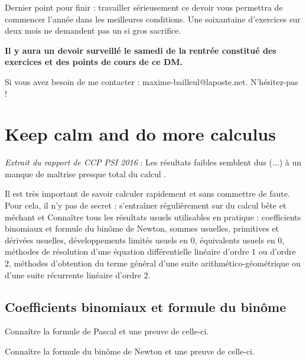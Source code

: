 \documentclass[a4paper,twoside,french,11pt]{VcCours}
\begin{document}
Dernier point pour finir : travailler sérieusement ce devoir vous permettra de commencer l'année dans les meilleures conditions. Une soixantaine d'exercices sur deux mois ne demandent pas un si gros sacrifice. 

\begin{center}
\end{center}

\begin{center}
\textbf{Il y aura un devoir surveillé  le samedi de la rentrée constitué des exercices et des points de cours de ce DM.}
\end{center}

Si vous avez besoin de me contacter : maxime-bailleul@laposte.net. N'hésitez-pas !

\section{Keep calm and do more calculus}

\textit{Extrait du rapport de CCP PSI 2016} : \og Les résultats faibles semblent dus ($\ldots$) à un manque de maîtrise presque total du calcul \fg .

Il est très important de savoir calculer rapidement et sans commettre de faute. Pour cela, il n'y pas de secret : s'entraîner régulièrement sur du calcul \og bête et méchant \fg et Connaître tous les résultats usuels utilisables en pratique : coefficients binomiaux et formule du binôme de Newton, sommes usuelles, primitives et dérivées usuelles, développements limités usuels en $0$, équivalents usuels en $0$, méthodes de résolution d'une équation différentielle linéaire d'ordre $1$ ou d'ordre $2$, méthodes d'obtention du terme général d'une suite arithmético-géométrique  ou d'une suite récurrente linéaire d'ordre $2$.

\subsection{Coefficients binomiaux et formule du binôme}

\begin{ptc}{}
	Connaître la formule de Pascal et une preuve de celle-ci.
\end{ptc}

\begin{ptc}{}
	Connaître la formule du binôme de Newton et une preuve de celle-ci.
\end{ptc}
\end{document}
